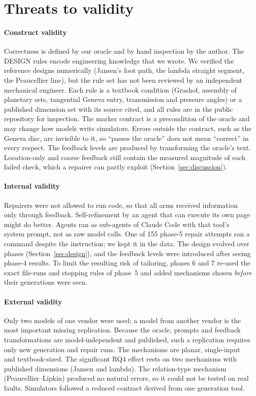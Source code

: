 \section{Threats to validity}\label{sec:threats}

\paragraph{Construct validity} Correctness is defined by our oracle and by hand inspection by the author. The DESIGN rules encode engineering knowledge that we wrote. We verified the reference designs numerically (Jansen's foot path, the lambda straight segment, the Peaucellier line), but the rule set has not been reviewed by an independent mechanical engineer. Each rule is a textbook condition (Grashof, assembly of planetary sets, tangential Geneva entry, transmission and pressure angles) or a published dimension set with its source cited, and all rules are in the public repository for inspection. The marker contract is a precondition of the oracle and may change how models write simulators. Errors outside the contract, such as the Geneva disc, are invisible to it, so ``passes the oracle'' does not mean ``correct'' in every respect. The feedback levels are produced by transforming the oracle's text. Location-only and coarse feedback still contain the measured magnitude of each failed check, which a repairer can partly exploit (Section~\ref{sec:discussion}).

\paragraph{Internal validity} Repairers were not allowed to run code, so that all arms received information only through feedback. Self-refinement by an agent that can execute its own page might do better. Agents ran as sub-agents of Claude Code with that tool's system prompt, not as raw model calls. One of 155 phase-5 repair attempts ran a command despite the instruction; we kept it in the data. The design evolved over phases (Section~\ref{sec:design}), and the feedback levels were introduced after seeing phase-4 results. To limit the resulting risk of tailoring, phases 6 and 7 re-used the exact file-runs and stopping rules of phase~5 and added mechanisms chosen \emph{before} their generations were seen.

\paragraph{External validity} Only two models of one vendor were used; a model from another vendor is the most important missing replication. Because the oracle, prompts and feedback transformations are model-independent and published, such a replication requires only new generation and repair runs. The mechanisms are planar, single-input and textbook-sized. The significant RQ4 effect rests on two mechanisms with published dimensions (Jansen and lambda). The relation-type mechanism (Peaucellier--Lipkin) produced no natural errors, so it could not be tested on real faults. Simulators followed a reduced contract derived from one generation tool.

